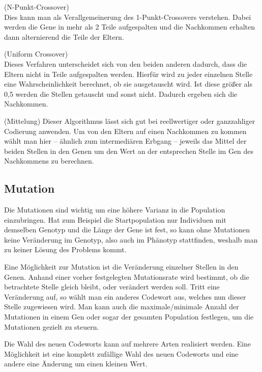 \begin{algo}(N-Punkt-Crossover)\\
	Dies kann man als Verallgemeinerung des 1-Punkt-Crossovers verstehen. Dabei werden die Gene in mehr als 2 Teile aufgespalten und die Nachkommen erhalten dann alternierend die Teile der Eltern.
\end{algo}

\begin{algo}(Uniform Crossover)\\
	Dieses Verfahren unterscheidet sich von den beiden anderen dadurch, dass die Eltern nicht in Teile aufgespalten werden. Hierfür wird zu jeder einzelnen Stelle eine Wahrscheinlichkeit berechnet, ob sie ausgetauscht wird. Ist diese größer als 0,5 werden die Stellen getauscht und sonst nicht. Dadurch ergeben sich die Nachkommen.
\end{algo}

\begin{algo}(Mittelung)
	Dieser Algorithmus lässt sich gut bei reellwertiger oder ganzzahliger Codierung anwenden. Um von den Eltern auf einen Nachkommen zu kommen wählt man hier -- ähnlich zum intermediären Erbgang -- jeweils das Mittel der beiden Stellen in den Genen um den Wert an der entsprechen Stelle im Gen des Nachkommens zu berechnen.
\end{algo}

\subsection{Mutation}
Die Mutationen sind wichtig um eine höhere Varianz in die Population einzubringen. Hat zum Beispiel die Startpopulation nur Individuen mit demselben Genotyp und die Länge der Gene ist fest, so kann ohne Mutationen keine Veränderung im Genotyp, also auch im Phänotyp stattfinden, weshalb man zu keiner Lösung des Problems kommt.

Eine Möglichkeit zur Mutation ist die Veränderung einzelner Stellen in den Genen.  Anhand einer vorher festgelegten Mutationsrate wird bestimmt, ob die betrachtete Stelle gleich bleibt, oder verändert werden soll. Tritt eine Veränderung auf, so wählt man ein anderes Codewort aus, welches nun dieser Stelle zugewiesen wird. Man kann auch die maximale/minimale Anzahl der Mutationen in einem Gen oder sogar der gesamten Population festlegen, um die Mutationen gezielt zu steuern.

Die Wahl des neuen Codeworts kann auf mehrere Arten realisiert werden. Eine Möglichkeit ist eine komplett zufällige Wahl des neuen Codeworts und eine andere eine Änderung um einen kleinen Wert.


